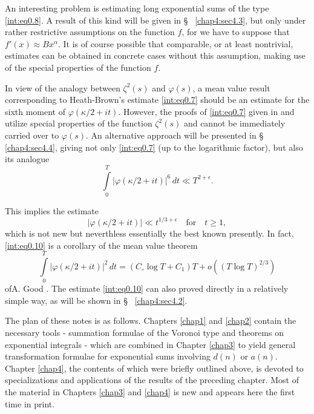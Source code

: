 An interesting problem is estimating long exponential sums of the type
\eqref{int:eq0.8}. A result of this kind will be given in \S~
\ref{chap4:sec4.3}, but only under rather restrictive assumptions on
the function $f$, for we have to suppose that $f'(x)\approx
Bx^\alpha$. It is of course possible that comparable, or at least
nontrivial, estimates can be obtained in concrete cases without this
assumption, making use of the special properties of the function $f$.

In view of the analogy between $\zeta^2(s)$ and $\varphi(s)$, a mean
value result corresponding to Heath-Brown's estimate \eqref{int:eq0.7}
should be an estimate for the sixth moment of
$\varphi(\kappa/2+it)$. However, the proofs of \eqref{int:eq0.7} given
in \cite{key11} and \cite{key13} utilize special properties of the
function $\zeta^2(s)$ and cannot be immediately carried over to
$\varphi(s)$. An alternative approach will be presented in \S~
\ref{chap4:sec4.4}, giving not only \eqref{int:eq0.7} (up to the
logarithmic factor), but also its analogue 
\begin{equation}
\int\limits_0^T|\varphi(\kappa/2+it)|^6\,dt \ll
T^{2+\epsilon}.\tag{0.9}\label{int:eq0.9} 
\end{equation}

This implies the estimate
\begin{equation}
|\varphi(\kappa/2+it)|\ll t^{1/3+\epsilon}\quad\text{for}\quad
t\geq 1,\tag{0.10}\label{int:eq0.10} 
\end{equation}
which is not new but neverthless essentially the best known
presently. In fact, \eqref{int:eq0.10} is a corollary of the mean
value theorem 
\begin{equation}
\int\limits_0^T|\varphi(\kappa/2+it)|^2\,dt = (C_\circ\log T+C_1)T +o
((T\log T)^{2/3})\tag{0.11}\label{int:eq0.11}
\end{equation}
of\pageoriginale A. Good \cite{key9}. The estimate \eqref{int:eq0.10}
can also proved directly in a relatively simple way, as will be shown
in \S ~ \ref{chap4:sec4.2}.

The plan of these notes is as follows. Chapters \ref{chap1} and
\ref{chap2} contain the necessary tools - summation formulae of the
Voronoi type and theorems on exponential integrals - which are
combined in Chapter \ref{chap3} to yield general transformation
formulae for exponential sums involving $d(n)$ or $a(n)$. Chapter
\ref{chap4}, the contents of which were briefly outlined above, is
devoted to specializations and applications of the results of the
preceding chapter. Most of the material in Chapters \ref{chap3} and
\ref{chap4} is new and appears here the first time in print.

